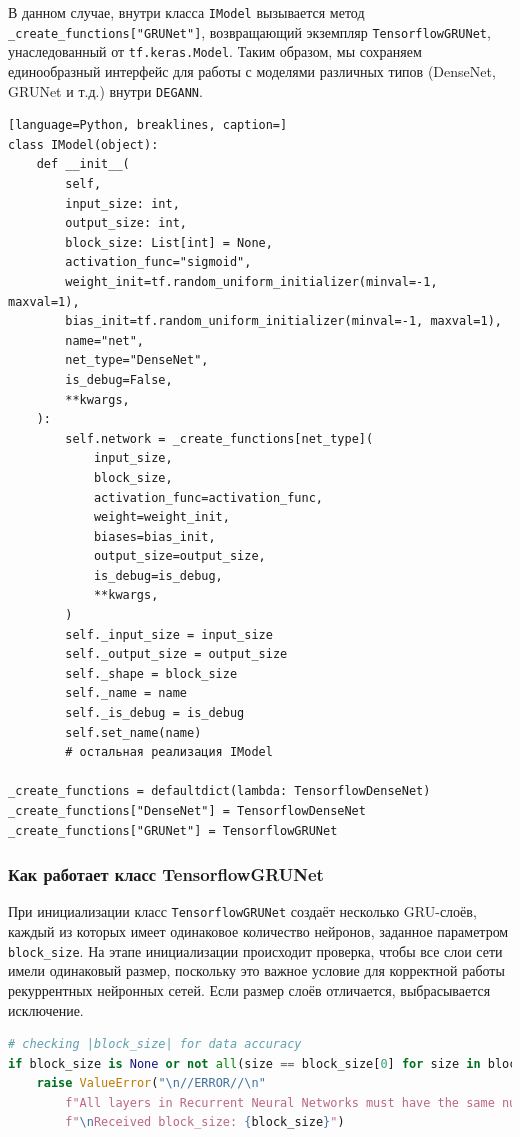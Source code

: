 В данном случае, внутри класса \texttt{IModel} вызывается метод \texttt{\_create\_functions["GRUNet"]}, возвращающий экземпляр \texttt{TensorflowGRUNet}, унаследованный от \texttt{tf.keras.Model}. Таким образом, мы сохраняем единообразный интерфейс для работы с моделями различных типов (DenseNet, GRUNet и т.д.) внутри \texttt{DEGANN}.

\begin{lstlisting}[language=Python, breaklines, caption=]
class IModel(object):
    def __init__(
        self,
        input_size: int,
        output_size: int,
        block_size: List[int] = None,
        activation_func="sigmoid",
        weight_init=tf.random_uniform_initializer(minval=-1, maxval=1),
        bias_init=tf.random_uniform_initializer(minval=-1, maxval=1),
        name="net",
        net_type="DenseNet",
        is_debug=False,
        **kwargs,
    ):
        self.network = _create_functions[net_type](
            input_size,
            block_size,
            activation_func=activation_func,
            weight=weight_init,
            biases=bias_init,
            output_size=output_size,
            is_debug=is_debug,
            **kwargs,
        )
        self._input_size = input_size
        self._output_size = output_size
        self._shape = block_size
        self._name = name
        self._is_debug = is_debug
        self.set_name(name)
        # остальная реализация IModel

_create_functions = defaultdict(lambda: TensorflowDenseNet)
_create_functions["DenseNet"] = TensorflowDenseNet
_create_functions["GRUNet"] = TensorflowGRUNet
\end{lstlisting}

\subsubsection{Как работает класс TensorflowGRUNet}
При инициализации класс \texttt{TensorflowGRUNet} создаёт несколько GRU-слоёв, каждый из которых имеет одинаковое количество нейронов, заданное параметром \texttt{block\_size}. На этапе инициализации происходит проверка, чтобы все слои сети имели одинаковый размер, поскольку это важное условие для корректной работы рекуррентных нейронных сетей. Если размер слоёв отличается, выбрасывается исключение.

\begin{lstlisting}[language=Python, breaklines, caption=Проверка размера слоев]
# checking |block_size| for data accuracy
if block_size is None or not all(size == block_size[0] for size in block_size):
    raise ValueError("\n//ERROR//\n"
        f"All layers in Recurrent Neural Networks must have the same number of neurons in each layer "
        f"\nReceived block_size: {block_size}")
\end{lstlisting}

